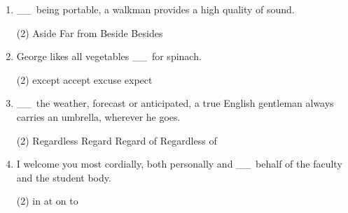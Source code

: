 \documentclass{yufa}
\newcommand\ttu{ \_\_\ }
\begin{document}
\begin{enumerate}
\item \ttu being portable, a walkman provides a high quality of sound.
  \begin{tasks}(2)
    \task Aside
    \task Far from
    \task Beside
    \task Besides
  \end{tasks}

\item George likes all vegetables \ttu for spinach.
  \begin{tasks}(2)
    \task except
    \task accept
    \task excuse
    \task expect
  \end{tasks}

\item \ttu the weather, forecast or anticipated, a true English gentleman always carries an umbrella, wherever he goes.
  \begin{tasks}(2)
    \task Regardless
    \task Regard
    \task Regard of
    \task Regardless of
  \end{tasks}

\item I welcome you most cordially, both personally and \ttu behalf of the faculty and the student body.
  \begin{tasks}(2)
    \task in
    \task at
    \task on
    \task to
  \end{tasks}
\end{enumerate}
\end{document}
